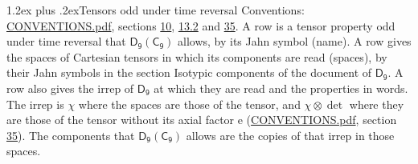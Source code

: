 \documentclass[10pt,a4paper]{article}
\makeatletter
\renewcommand\section{\@startsection{section}{1}{\z@}{-3ex plus -1ex minus -.2ex}%
  {1.2ex plus .2ex}{\normalfont\large\sffamily\bfseries\color{parttitle}}}
\numberwithin{equation}{section}
\newcommand{\grp}[1]{\mathsf{#1}}
\newcommand{\irrprod}{\otimes}
\makeatother
\begin{document}
\section{Tensors odd under time reversal}\label{s:time_odd}
Conventions: \href{../../CONVENTIONS.pdf}{CONVENTIONS.pdf}, sections \href{../../../rotation/CONVENTIONS.pdf\#conv.10}{10}, \href{../../../rotation/CONVENTIONS.pdf\#conv.13.2}{13.2} and \href{../../CONVENTIONS.pdf\#conv.35}{35}.
\leavevmode\label{n:head.name.property}A row is a tensor property odd under time reversal that $\grp{D_{9}}(\grp{C_{9}})$ allows, by its Jahn symbol (name). \label{n:head.spaces}A row gives the spaces of Cartesian tensors in which its components are read (spaces), by their Jahn symbols in the section Isotypic components of the document of \href{../../../rotation/data/pdf/D9.pdf}{$\grp{D_{9}}$}. \label{n:head.properties}A row also gives the irrep of $\grp{D_{9}}$ at which they are read and the properties in words. The irrep is $\chi$ where the spaces are those of the tensor, and $\chi \irrprod \det$ where they are those of the tensor without its axial factor e (\href{../../CONVENTIONS.pdf}{CONVENTIONS.pdf}, section \href{../../CONVENTIONS.pdf\#conv.35}{35}). The components that $\grp{D_{9}}(\grp{C_{9}})$ allows are the copies of that irrep in those spaces.
\end{document}
